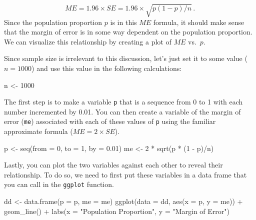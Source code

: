 \documentclass[
]{article}
\newenvironment{Shaded}{\begin{snugshade}}{\end{snugshade}}
\newcommand{\AttributeTok}[1]{\textcolor[rgb]{0.77,0.63,0.00}{#1}}
\newcommand{\DecValTok}[1]{\textcolor[rgb]{0.00,0.00,0.81}{#1}}
\newcommand{\FloatTok}[1]{\textcolor[rgb]{0.00,0.00,0.81}{#1}}
\newcommand{\FunctionTok}[1]{\textcolor[rgb]{0.00,0.00,0.00}{#1}}
\newcommand{\NormalTok}[1]{#1}
\newcommand{\OtherTok}[1]{\textcolor[rgb]{0.56,0.35,0.01}{#1}}
\newcommand{\SpecialCharTok}[1]{\textcolor[rgb]{0.00,0.00,0.00}{#1}}
\newcommand{\StringTok}[1]{\textcolor[rgb]{0.31,0.60,0.02}{#1}}
\begin{document}
\[
ME = 1.96\times SE = 1.96\times\sqrt{p(1-p)/n} \,.
\] Since the population proportion \(p\) is in this \(ME\) formula, it
should make sense that the margin of error is in some way dependent on
the population proportion. We can visualize this relationship by
creating a plot of \(ME\) vs.~\(p\).

Since sample size is irrelevant to this discussion, let's just set it to
some value (\(n = 1000\)) and use this value in the following
calculations:

\begin{Shaded}
\begin{Highlighting}[]
\NormalTok{n }\OtherTok{\textless{}{-}} \DecValTok{1000}
\end{Highlighting}
\end{Shaded}

The first step is to make a variable \texttt{p} that is a sequence from
0 to 1 with each number incremented by 0.01. You can then create a
variable of the margin of error (\texttt{me}) associated with each of
these values of \texttt{p} using the familiar approximate formula
(\(ME = 2 \times SE\)).

\begin{Shaded}
\begin{Highlighting}[]
\NormalTok{p }\OtherTok{\textless{}{-}} \FunctionTok{seq}\NormalTok{(}\AttributeTok{from =} \DecValTok{0}\NormalTok{, }\AttributeTok{to =} \DecValTok{1}\NormalTok{, }\AttributeTok{by =} \FloatTok{0.01}\NormalTok{)}
\NormalTok{me }\OtherTok{\textless{}{-}} \DecValTok{2} \SpecialCharTok{*} \FunctionTok{sqrt}\NormalTok{(p }\SpecialCharTok{*}\NormalTok{ (}\DecValTok{1} \SpecialCharTok{{-}}\NormalTok{ p)}\SpecialCharTok{/}\NormalTok{n)}
\end{Highlighting}
\end{Shaded}

Lastly, you can plot the two variables against each other to reveal
their relationship. To do so, we need to first put these variables in a
data frame that you can call in the \texttt{ggplot} function.

\begin{Shaded}
\begin{Highlighting}[]
\NormalTok{dd }\OtherTok{\textless{}{-}} \FunctionTok{data.frame}\NormalTok{(}\AttributeTok{p =}\NormalTok{ p, }\AttributeTok{me =}\NormalTok{ me)}
\FunctionTok{ggplot}\NormalTok{(}\AttributeTok{data =}\NormalTok{ dd, }\FunctionTok{aes}\NormalTok{(}\AttributeTok{x =}\NormalTok{ p, }\AttributeTok{y =}\NormalTok{ me)) }\SpecialCharTok{+} 
  \FunctionTok{geom\_line}\NormalTok{() }\SpecialCharTok{+}
  \FunctionTok{labs}\NormalTok{(}\AttributeTok{x =} \StringTok{"Population Proportion"}\NormalTok{, }\AttributeTok{y =} \StringTok{"Margin of Error"}\NormalTok{)}
\end{Highlighting}
\end{Shaded}
\end{document}
